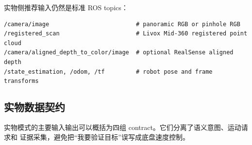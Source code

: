 \documentclass[UTF8,zihao=-4]{ctexart}
\begin{document}
实物侧推荐输入仍然是标准 ROS topics：

\begin{lstlisting}[style=pseudo,caption={Real robot 输入 topic}]
/camera/image                         # panoramic RGB or pinhole RGB
/registered_scan                      # Livox Mid-360 registered point cloud
/camera/aligned_depth_to_color/image  # optional RealSense aligned depth
/state_estimation, /odom, /tf         # robot pose and frame transforms
\end{lstlisting}

\subsection{实物数据契约}

实物模式的主要输入输出可以概括为四组 contract。它们分离了语义意图、运动请求和
证据采集，避免把“我要验证目标”误写成底盘速度控制。
\end{document}

